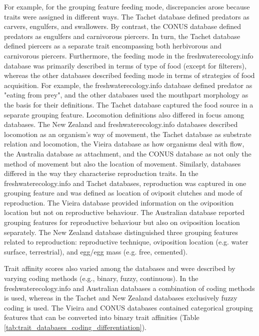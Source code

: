 \documentclass[12pt]{article}
\begin{document}
For example, for the grouping feature feeding mode, discrepancies arose because traits were assigned in different ways. The Tachet database defined predators as carvers, engulfers, and swallowers. By contrast, the CONUS database defined predators as engulfers and carnivorous piercers. In turn, the Tachet database defined piercers as a separate trait encompassing both herbivorous and carnivorous piercers. Furthermore, the feeding mode in the freshwaterecology.info database was primarily described in terms of type of food (except for filterers), whereas the other databases described feeding mode in terms of strategies of food acquisition. For example, the freshwaterecology.info database defined predator as "eating from prey", and the other databases used the mouthpart morphology as the basis for their definitions. The Tachet database captured the food source in a separate grouping feature. Locomotion definitions also differed in focus among databases. The New Zealand and freshwaterecology.info databases described locomotion as an organism’s way of movement, the Tachet database as substrate relation and locomotion, the Vieira database as how organisms deal with flow, the Australia database as attachment, and the CONUS database as not only the method of movement but also the location of movement. Similarly, databases differed in the way they characterise reproduction traits. In the freshwaterecology.info and Tachet databases, reproduction was captured in one grouping feature and was defined as location of oviposit clutches and mode of reproduction. The Vieira database provided information on the oviposition location but not on reproductive behaviour. The Australian database reported grouping features for reproductive behaviour but also on oviposition location separately. The New Zealand database distinguished three grouping features related to reproduction: reproductive technique, oviposition location (e.g. water surface, terrestrial), and egg/egg mass (e.g. free, cemented).

Trait affinity scores also varied among the databases and were described by varying coding methods (e.g., binary, fuzzy, continuous). In the freshwaterecology.info and Australian databases a combination of coding methods is used, whereas in the Tachet and New Zealand databases exclusively fuzzy coding is used. The Vieira and CONUS databases contained categorical grouping features that can be converted into binary trait affinities (Table \ref{tab:trait_databases_coding_differentiation}).
\end{document}

